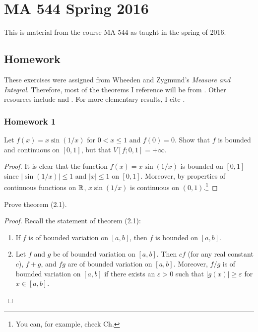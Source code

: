 \chapter{MA 544 Spring 2016}
\thispagestyle{empty}
This is material from the course MA 544 as taught in the spring of 2016.
\bigskip
\section{Homework}
These exercises were assigned from Wheeden and Zygmund's \emph{Measure and
  Integral}. Therefore, most of the theorems I reference will be from
\cite{wheeden-zygmund}. Other resources include \cite{folland} and
\cite{royden}. For more elementary results, I cite \cite{rudin-1}.
\subsection{Homework 1}
\begin{problem}
Let $f(x)=x\sin(1/x)$ for $0<x\leq 1$ and $f(0)=0$. Show that $f$ is
bounded and continuous on $[0,1]$, but that $V[f;0,1]=+\infty$.
\end{problem}
\begin{proof}
It is clear that the function $f(x)=x\sin(1/x)$ is bounded on $[0,1]$ since
$|{\sin(1/x)}|\leq 1$ and $|x|\leq 1$ on $[0,1]$. Moreover, by properties
of continuous functions on $\mathbb{R}$, $x\sin(1/x)$ is continuous on
$(0,1)$.\footnote{You can, for example, check Ch.\@ }
\end{proof}

\begin{problem}
Prove theorem (2.1).
\end{problem}
\begin{proof}
Recall the statement of theorem (2.1):
\begin{theorem*}
\begin{enumerate}[label=(\alph*)]
\item If $f$ is of bounded variation on $[a,b]$, then $f$ is bounded on
  $[a,b]$.
\item Let $f$ and $g$ be of bounded variation on $[a,b]$. Then $cf$ (for
  any real constant $c$), $f+g$, and $fg$ are of bounded variation on
  $[a,b]$. Moreover, $f/g$ is of bounded variation on $[a,b]$ if there
  exists an $\varepsilon>0$ such that $|g(x)|\geq\varepsilon$ for
  $x\in[a,b]$.
\end{enumerate}
\end{theorem*}
\end{proof}

